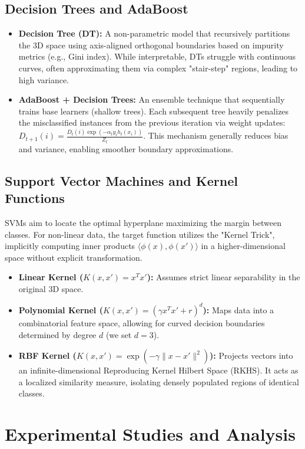 \documentclass[12pt,a4paper]{article}
\begin{document}
\subsection{Decision Trees and AdaBoost}
\begin{itemize}
    \item \textbf{Decision Tree (DT):} A non-parametric model that recursively partitions the 3D space using axis-aligned orthogonal boundaries based on impurity metrics (e.g., Gini index). While interpretable, DTs struggle with continuous curves, often approximating them via complex "stair-step" regions, leading to high variance.
    \item \textbf{AdaBoost + Decision Trees:} An ensemble technique that sequentially trains base learners (shallow trees). Each subsequent tree heavily penalizes the misclassified instances from the previous iteration via weight updates: $D_{t+1}(i) = \frac{D_t(i) \exp(-\alpha_t y_i h_t(x_i))}{Z_t}$. This mechanism generally reduces bias and variance, enabling smoother boundary approximations.
\end{itemize}

\subsection{Support Vector Machines and Kernel Functions}
SVMs aim to locate the optimal hyperplane maximizing the margin between classes. For non-linear data, the target function utilizes the "Kernel Trick", implicitly computing inner products $\langle \phi(x), \phi(x') \rangle$ in a higher-dimensional space without explicit transformation.
\begin{itemize}
    \item \textbf{Linear Kernel ($K(x, x') = x^T x'$):} Assumes strict linear separability in the original 3D space.
    \item \textbf{Polynomial Kernel ($K(x, x') = (\gamma x^T x' + r)^d$):} Maps data into a combinatorial feature space, allowing for curved decision boundaries determined by degree $d$ (we set $d=3$).
    \item \textbf{RBF Kernel ($K(x, x') = \exp(-\gamma \|x - x'\|^2)$):} Projects vectors into an infinite-dimensional Reproducing Kernel Hilbert Space (RKHS). It acts as a localized similarity measure, isolating densely populated regions of identical classes.
\end{itemize}

\section{Experimental Studies and Analysis}
\end{document}
